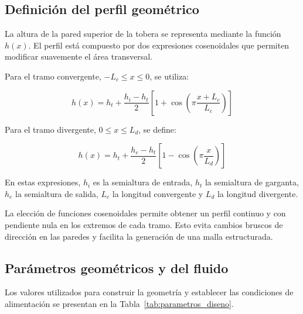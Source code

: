 \documentclass[12pt,letterpaper]{article}
\numberwithin{equation}{section}
\begin{document}
\subsection{Definición del perfil geométrico}

La altura de la pared superior de la tobera
se representa mediante la función $h(x)$.
El perfil está compuesto por dos expresiones
cosenoidales que permiten modificar suavemente
el área transversal.

Para el tramo convergente,
$-L_c\leq x\leq 0$, se utiliza:

\begin{equation}
h(x)=h_t+
\frac{h_i-h_t}{2}
\left[
1+\cos\left(
\pi\frac{x+L_c}{L_c}
\right)
\right]
\label{eq:perfil_convergente}
\end{equation}

Para el tramo divergente,
$0\leq x\leq L_d$, se define:

\begin{equation}
h(x)=h_t+
\frac{h_e-h_t}{2}
\left[
1-\cos\left(
\pi\frac{x}{L_d}
\right)
\right]
\label{eq:perfil_divergente}
\end{equation}

En estas expresiones, $h_i$ es la semialtura
de entrada, $h_t$ la semialtura de garganta,
$h_e$ la semialtura de salida, $L_c$ la
longitud convergente y $L_d$ la longitud
divergente.

La elección de funciones cosenoidales permite
obtener un perfil continuo y con pendiente
nula en los extremos de cada tramo. Esto
evita cambios bruscos de dirección en las
paredes y facilita la generación de una
malla estructurada.

\subsection{Parámetros geométricos y del fluido}

Los valores utilizados para construir la
geometría y establecer las condiciones
de alimentación se presentan en la
Tabla~\ref{tab:parametros_diseno}.
\end{document}
